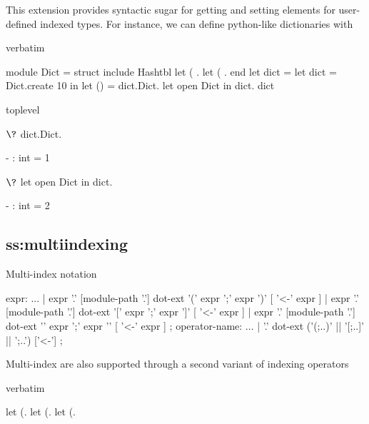{This extension provides syntactic sugar for getting and setting elements
for user-defined indexed types. For instance, we can define python-like
dictionaries with
\begin{camlexample}{verbatim}
\begin{caml}
\begin{camlinput}
module Dict = struct
include Hashtbl
let ( .%
let ( .%
end
let dict =
  let dict = Dict.create 10 in
  let () =
    dict.Dict.%
    let open Dict in
    dict.%
  dict
\end{camlinput}
\end{caml}
\end{camlexample}
\begin{camlexample}{toplevel}
\begin{caml}
\begin{camlinput}
$\?$ dict.Dict.%
\end{camlinput}
\begin{camloutput}
- : int = 1
\end{camloutput}
\end{caml}
\begin{caml}
\begin{camlinput}
$\?$ let open Dict in dict.%
\end{camlinput}
\begin{camloutput}
- : int = 2
\end{camloutput}
\end{caml}
\end{camlexample}

\subsection{ss:multiindexing}{Multi-index notation}
\begin{syntax}
expr:
          ...
        | expr '.' [module-path '.'] dot-ext '(' expr {{';' expr }} ')' [ '<-' expr ]
        | expr '.' [module-path '.'] dot-ext '[' expr {{';' expr }} ']' [ '<-' expr ]
        | expr '.' [module-path '.'] dot-ext '{' expr {{';' expr }} '}' [ '<-' expr ]
;
operator-name:
          ...
        | '.' dot-ext ('(;..)' || '[;..]' || '{;..}') ['<-']
;
\end{syntax}

Multi-index are also supported through a second variant of indexing operators

\begin{camlexample}{verbatim}
\begin{caml}
\begin{camlinput}
let (.%
let (.%
let (.%
\end{camlinput}
\end{caml}
\end{camlexample}

}
